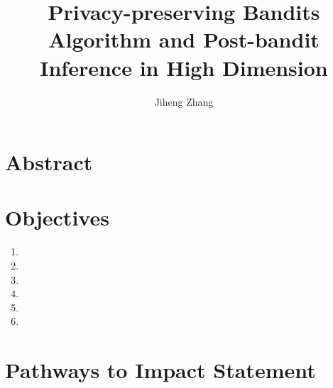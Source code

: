 \documentclass[12pt]{article}
\title{Privacy-preserving Bandits Algorithm and Post-bandit Inference in High Dimension}
\author{Jiheng Zhang}
\newcommand{\1}{\mathbf{1}}
\begin{document}
\pagestyle{empty}

\maketitle
\tableofcontents

\newpage



\section*{Abstract}
\label{sec:abs}

\begin{spacing}{1.36}
\end{spacing}

\newpage

\section*{Objectives}

\begin{enumerate}

\item 
\item 
\item 
\item 
\item 
\item 
\end{enumerate}

\newpage


\section*{Pathways to Impact Statement}
\label{sec:impact}

\setcounter{page}{1}
\pagestyle{plain}

\begin{spacing}{1.07}


\end{spacing}

\newpage



\setcounter{page}{1}
\pagestyle{plain}
\end{document}
